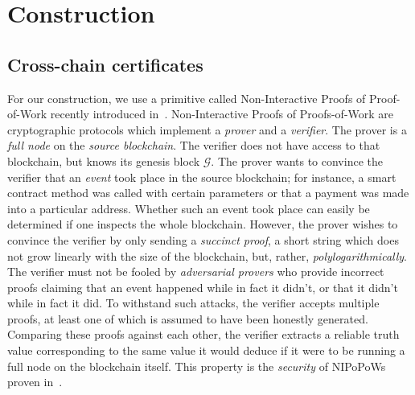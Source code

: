 \section{Construction}
\subsection*{Cross-chain certificates}
For our construction, we use a primitive called Non-Interactive Proofs of
Proof-of-Work recently introduced in~\cite{nipopows}.
Non-Interactive Proofs of Proofs-of-Work are cryptographic protocols which
implement a \emph{prover} and a \emph{verifier}. The prover is a \emph{full
node} on the \emph{source blockchain}. The verifier does not have access to
that blockchain, but knows its genesis block $\mathcal{G}$. The prover wants to
convince the verifier that an \emph{event} took place in the source blockchain;
for instance, a smart contract method was called with certain parameters or that
a payment was made into a particular address. Whether such an event took place
can easily be determined if one inspects the whole blockchain. However, the
prover wishes to convince the verifier by only sending a \emph{succinct proof},
a short string which does not grow linearly  with the size of the blockchain,
but, rather, \emph{polylogarithmically}. The verifier must not be fooled by
\emph{adversarial provers} who provide incorrect proofs claiming that an event
happened while in fact it didn't, or that it didn't while in fact it did. To
withstand such attacks, the verifier accepts multiple proofs, at least one of
which is assumed to have been honestly generated. Comparing these proofs against
each other, the verifier extracts a reliable truth value corresponding to the
same value it would deduce if it were to be running a full node on the
blockchain itself. This property is the \emph{security} of NIPoPoWs proven
in~\cite{nipopows}.

